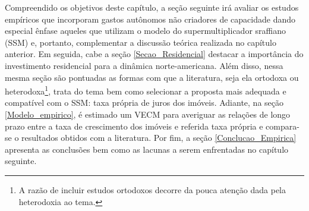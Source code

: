 Compreendido os objetivos deste capítulo, a seção seguinte irá avaliar os estudos empíricos que incorporam gastos autônomos não criadores de capacidade dando especial ênfase aqueles que utilizam o modelo do supermultiplicador sraffiano (SSM) e, portanto, complementar a discussão teórica realizada no capítulo anterior. Em seguida, cabe a seção \ref{Secao_Residencial} destacar a importância do investimento residencial para a dinâmica norte-americana. Além disso, nessa mesma seção são pontuadas as formas com que a literatura, seja ela ortodoxa ou heterodoxa\footnote{A razão de incluir estudos ortodoxos decorre da pouca atenção dada pela heterodoxia ao tema.}, trata do tema bem como selecionar a proposta mais adequada e compatível com o SSM: taxa própria de juros dos imóveis. Adiante, na seção \ref{Modelo_empirico}, é estimado um VECM  para averiguar as relações de longo prazo entre a taxa de crescimento dos imóveis e referida taxa própria e compara-se o resultados obtidos com a literatura. Por fim, a seção \ref{Conclucao_Empirica} apresenta as conclusões bem como as lacunas a serem enfrentadas no capítulo seguinte.